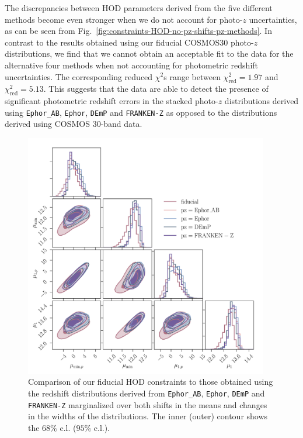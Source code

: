 \documentclass[a4paper,11pt]{article}
\begin{document}
      The discrepancies between HOD parameters derived from the five different methods become even stronger when we do not account for photo-$z$ uncertainties, as can be seen from Fig.~\ref{fig:constraints-HOD-no-pz-shifts-pz-methods}. In contrast to the results obtained using our fiducial COSMOS30 photo-$z$ distributions, we find that we cannot obtain an acceptable fit to the data for the alternative four methods when not accounting for photometric redshift uncertainties. The corresponding reduced $\chi^{2}$s range between $\chi^{2}_{\mathrm{red}} = 1.97$ and $\chi^{2}_{\mathrm{red}} = 5.13$. This suggests that the data are able to detect the presence of significant photometric redshift errors in the stacked photo-$z$ distributions derived using \texttt{Ephor\_AB}, \texttt{Ephor}, \texttt{DEmP} and \texttt{FRANKEN-Z} as opposed to the distributions derived using COSMOS 30-band data.

      \begin{figure}
        \begin{center}
          \includegraphics[width=0.95\textwidth]{figures/contours-Mmin-M1_mPk=HOD_fix=alpha-fc-sigmaM_HOD=zevol_fit=pz-shifts-pz-widths+prior=0p2_fit=auto+cross_cosmo=const_HOD-param=zfid_clfit=HOD-zevol_pz-methods.pdf}
          \caption{Comparison of our fiducial HOD constraints to those obtained using the redshift distributions derived from \texttt{Ephor\_AB}, \texttt{Ephor}, \texttt{DEmP} and \texttt{FRANKEN-Z} marginalized over both shifts in the means and changes in the widths of the distributions. The inner (outer) contour shows the $68 \%$ c.l. ($95 \%$ c.l.).}
          \label{fig:constraints-HOD-fit-pz-shifts+pz-widths-pz-methods}
        \end{center}
      \end{figure}
 
\end{document}
